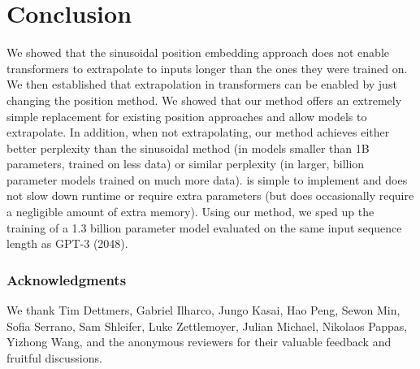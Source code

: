 \section{Conclusion}

We showed that the sinusoidal position embedding approach does not enable transformers to extrapolate to inputs longer than the ones they were trained on. We then established that extrapolation in transformers can be enabled by just changing the position method.
We showed that our \al method offers an extremely simple replacement for existing position approaches and allow models to extrapolate. In addition, when not extrapolating, our method achieves either better perplexity than the sinusoidal method (in models smaller than 1B parameters, trained on less data) or similar perplexity (in larger, billion parameter models trained on much more data). 
\al is simple to implement and does not slow down runtime or require extra parameters (but does occasionally require a negligible amount of extra memory).
Using our method, we sped up the training of a 1.3 billion parameter model evaluated on the same input sequence length as GPT-3 (2048). 

\subsubsection*{Acknowledgments}
We thank Tim Dettmers, Gabriel Ilharco, Jungo Kasai, Hao Peng, Sewon Min, Sofia Serrano, Sam Shleifer, Luke Zettlemoyer, Julian Michael, Nikolaos Pappas, Yizhong Wang, and the anonymous reviewers for their valuable feedback and fruitful discussions.
\clearpage

\clearpage

